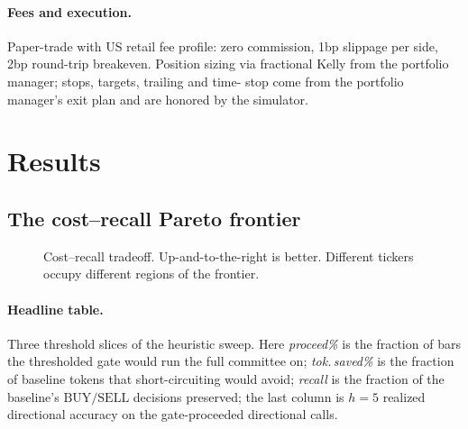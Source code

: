 \documentclass[11pt,a4paper]{article}
\begin{document}
\paragraph{Fees and execution.}
Paper-trade with US retail fee profile: zero commission, 1bp slippage
per side, 2bp round-trip breakeven. Position sizing via fractional
Kelly from the portfolio manager; stops, targets, trailing and time-
stop come from the portfolio manager's exit plan and are honored by the
simulator.

\section{Results}
\label{sec:results}

\subsection{The cost--recall Pareto frontier}
\label{sec:results-pareto}

\begin{figure}[h]
  \centering
  \caption{Cost--recall tradeoff. Up-and-to-the-right is better.
  Different tickers occupy different regions of the frontier.}
  \label{fig:pareto}
\end{figure}

\paragraph{Headline table.} Three threshold slices of the heuristic
sweep. Here \emph{proceed\%} is the fraction of bars the thresholded
gate would run the full committee on; \emph{tok.\,saved\%} is the
fraction of baseline tokens that short-circuiting would avoid;
\emph{recall} is the fraction of the baseline's $\mathrm{BUY}/\mathrm{SELL}$
decisions preserved; the last column is $h{=}5$ realized directional
accuracy on the gate-proceeded directional calls.
\end{document}
